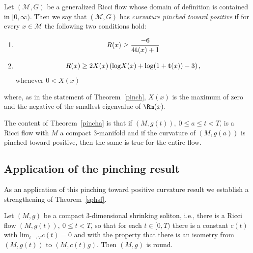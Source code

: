 \begin{definition}
\label{def:curvature-pinched-toward-positive}
\label{pinchd}
Let $({\mathcal M},G)$ be a generalized Ricci flow whose domain of definition
is contained in $[0,\infty)$. Then we say that $({\mathcal M},G)$ has {\em
curvature pinched toward positive} if
for every $x\in {\mathcal M}$ the following two conditions hold:
\begin{enumerate}
\item $$R(x)\ge \frac{-6}{4{\bf t}(x)+1}$$
\item $$R(x)\geq 2X(x)\left(\mathrm{log}X(x)+\mathrm{log}(1+{\bf t}(x))-3\right),
$$ whenever
$0<X(x)$
\end{enumerate}
where, as in the statement of Theorem~\ref{pinch}, $X(x)$ is the
maximum of zero and the negative of the smallest eigenvalue of $\Rm(x)$.
\end{definition}

The content of Theorem~\ref{pincha} is that if $(M,g(t)),\ 0\le a\le
t<T$, is a Ricci flow with $M$ a compact $3$-manifold and if the
curvature of $(M,g(a))$ is pinched toward positive, then the same is
true for the entire flow.


\subsection{Application of the pinching result}


As an application of this pinching toward positive curvature result
we establish a strengthening of Theorem~\ref{sphsf}.


\begin{theorem}
\label{thm:shrinking-soliton-round}
Let $(M,g)$ be a compact $3$-dimensional shrinking soliton, i.e.,
there is a Ricci flow $(M,g(t)),\ 0\le t<T$, so that for each $t\in
[0,T)$ there is a constant $c(t)$ with  $\mathrm{lim}_{t\rightarrow
T}c(t)=0$ and with the property that there is an isometry from
$(M,g(t))$ to $(M,c(t)g)$. Then $(M,g)$ is round.
\end{theorem}

